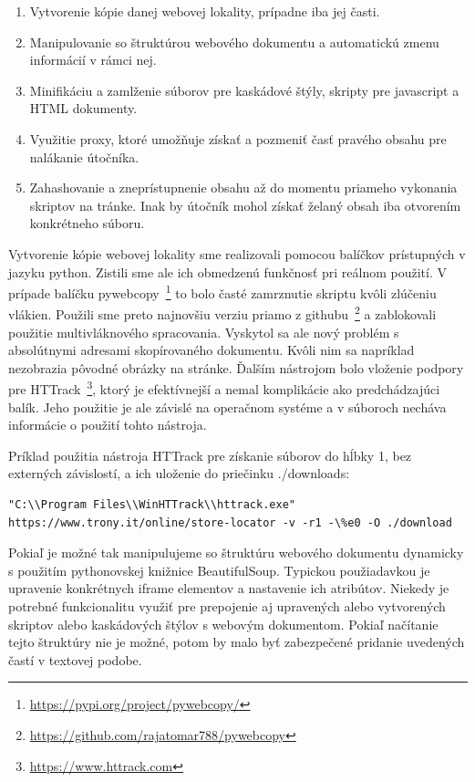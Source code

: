 \documentclass[conference, 11pt,slovak,a4paper,twoside]{IEEEtran}
\begin{document}
\begin{enumerate}
	\item Vytvorenie kópie danej webovej lokality, prípadne iba jej časti. 

	\item Manipulovanie so štruktúrou webového dokumentu a automatickú zmenu informácií v rámci nej.
	
	\item Minifikáciu a zamlženie súborov pre kaskádové štýly, skripty pre javascript a HTML dokumenty. 

	\item Využitie proxy, ktoré umožňuje získať a pozmeniť časť pravého obsahu pre nalákanie útočníka.
	
	\item Zahashovanie a zneprístupnenie obsahu až do momentu priameho vykonania skriptov na tránke. Inak by útočník mohol získať želaný obsah iba otvorením konkrétneho súboru.
\end{enumerate}

Vytvorenie kópie webovej lokality sme realizovali pomocou balíčkov prístupných v jazyku python. Zistili sme ale ich obmedzenú funkčnosť pri reálnom použití. V prípade balíčku pywebcopy~\footnote{\url{https://pypi.org/project/pywebcopy/}} to bolo časté zamrznutie skriptu kvôli zlúčeniu vlákien. Použili sme preto najnovšiu verziu priamo z githubu~\footnote{\url{https://github.com/rajatomar788/pywebcopy}} a zablokovali použitie multivláknového spracovania. Vyskytol sa ale nový problém s absolútnymi adresami skopírovaného dokumentu. Kvôli nim sa napríklad nezobrazia pôvodné obrázky na stránke. Ďalším nástrojom bolo vloženie podpory pre HTTrack~\footnote{\url{https://www.httrack.com}}, ktorý je efektívnejší a nemal komplikácie ako predchádzajúci balík. Jeho použitie je ale závislé na operačnom systéme a v súboroch necháva informácie o použití tohto nástroja.

Príklad použitia nástroja HTTrack pre získanie súborov do hĺbky 1, bez externých závislostí, a ich uloženie do priečinku ./downloads:

\begin{lstlisting}
"C:\\Program Files\\WinHTTrack\\httrack.exe" https://www.trony.it/online/store-locator -v -r1 -\%e0 -O ./download
\end{lstlisting}


Pokiaľ je možné tak manipulujeme so štruktúru webového dokumentu dynamicky s použitím pythonovskej knižnice BeautifulSoup. Typickou použiadavkou je upravenie konkrétnych iframe elementov a nastavenie ich atribútov. Niekedy je potrebné funkcionalitu využiť pre prepojenie aj upravených alebo vytvorených skriptov alebo kaskádových štýlov s webovým dokumentom. Pokiaľ načítanie tejto štruktúry nie je možné, potom by malo byť zabezpečené pridanie uvedených častí v textovej podobe.
\end{document}
